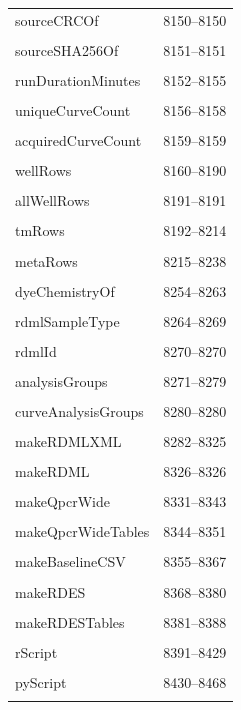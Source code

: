 {\begin{longtable}{@{}p{11cm}r@{}}
sourceCRCOf & 8150--8150 \\\\\hline
sourceSHA256Of & 8151--8151 \\\\\hline
runDurationMinutes & 8152--8155 \\\\\hline
uniqueCurveCount & 8156--8158 \\\\\hline
acquiredCurveCount & 8159--8159 \\\\\hline
wellRows & 8160--8190 \\\\\hline
allWellRows & 8191--8191 \\\\\hline
tmRows & 8192--8214 \\\\\hline
metaRows & 8215--8238 \\\\\hline
dyeChemistryOf & 8254--8263 \\\\\hline
rdmlSampleType & 8264--8269 \\\\\hline
rdmlId & 8270--8270 \\\\\hline
analysisGroups & 8271--8279 \\\\\hline
curveAnalysisGroups & 8280--8280 \\\\\hline
makeRDMLXML & 8282--8325 \\\\\hline
makeRDML & 8326--8326 \\\\\hline
makeQpcrWide & 8331--8343 \\\\\hline
makeQpcrWideTables & 8344--8351 \\\\\hline
makeBaselineCSV & 8355--8367 \\\\\hline
makeRDES & 8368--8380 \\\\\hline
makeRDESTables & 8381--8388 \\\\\hline
rScript & 8391--8429 \\\\\hline
pyScript & 8430--8468 \\\\\hline

\end{longtable}}

